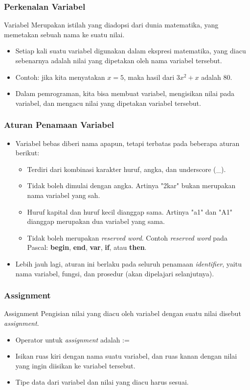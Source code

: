 \begin{frame}[b]
\frametitle{Perkenalan Variabel}
\begin{block}{Variabel}
   Merupakan istilah yang diadopsi dari dunia matematika, yang memetakan sebuah nama ke suatu nilai.
\end{block}
\begin{itemize}
  \item Setiap kali suatu variabel digunakan dalam ekspresi matematika, yang diacu sebenarnya adalah nilai yang dipetakan oleh nama variabel tersebut.
  \item Contoh: jika kita menyatakan $x=5$, maka hasil dari $3x^2 + x$ adalah $80$.
  \item Dalam pemrograman, kita bisa membuat variabel, mengisikan nilai pada variabel, dan mengacu nilai yang dipetakan variabel tersebut.
\end{itemize}
\end{frame}

\begin{frame}
\frametitle{Aturan Penamaan Variabel}
\begin{itemize}
  \item Variabel bebas diberi nama apapun, tetapi terbatas pada beberapa aturan berikut:
  \begin{itemize}
    \item Terdiri dari kombinasi karakter huruf, angka, dan underscore (\_).
    \item Tidak boleh dimulai dengan angka. Artinya "2kar" bukan merupakan nama variabel yang sah.
    \item Huruf kapital dan huruf kecil dianggap sama. Artinya "a1" dan "A1" dianggap merupakan dua variabel yang sama.
    \item Tidak boleh merupakan \alert{\textit{reserved word}}. Contoh \textit{reserved word} pada Pascal: \textbf{begin}, \textbf{end}, \textbf{var}, \textbf{if}, atau \textbf{then}.
  \end{itemize}
  \item Lebih jauh lagi, aturan ini berlaku pada seluruh penamaan \alert{\textit{identifier}}, yaitu nama variabel, fungsi, dan prosedur (akan dipelajari selanjutnya).
\end{itemize}
\end{frame}

\begin{frame}
\frametitle{Assignment}
\begin{block}{Assignment}
  Pengisian nilai yang diacu oleh variabel dengan suatu nilai disebut \alert{\textit{assignment}.}
\end{block}
\begin{itemize}
  \item Operator untuk \textit{assignment} adalah :=
  \item Isikan ruas kiri dengan nama suatu variabel, dan ruas kanan dengan nilai yang ingin diisikan ke variabel tersebut.
  \item Tipe data dari variabel dan nilai yang diacu \alert{harus sesuai}.
\end{itemize}
\end{frame}


